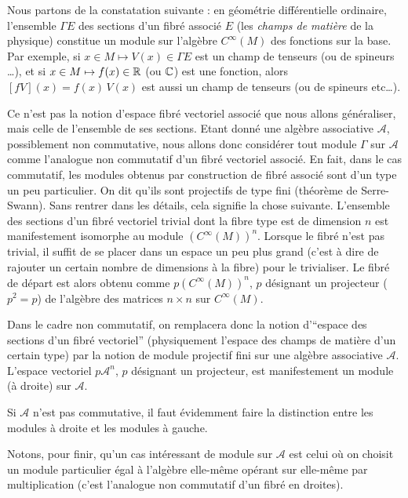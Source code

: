 Nous partons de la constatation suivante : en g\'eom\'etrie diff\'erentielle 
ordinaire, l'ensemble $\Gamma E$ des sections 
d'un fibr\'e associ\'e $E$ (les {\it champs de mati\`ere\/} de la 
physique) constitue un module sur l'alg\`ebre $C^\infty(M)$ des fonctions sur la base.
Par exemple, si $x \in M \mapsto V(x) \in \Gamma E$ est un champ de tenseurs (ou 
de spineurs \ldots), et si $x \in M \mapsto f(x) \in \mathbb{R} $ (ou $\mathbb{C}$) est 
une fonction, alors $ [fV](x) = f(x) \, V(x)$ est aussi un champ de 
tenseurs (ou de spineurs etc\ldots).

Ce n'est pas la notion d'espace fibr\'e vectoriel associ\'e que nous allons 
g\'en\'eraliser, mais celle de l'ensemble de ses sections.
Etant donn\'e une alg\`ebre associative ${\mathcal A}$, possiblement 
non commutative, nous allons donc consid\'erer tout module $\Gamma$ sur ${\mathcal 
A}$ comme l'analogue non commutatif d'un fibr\'e vectoriel associ\'e.
En fait, dans le cas commutatif, les modules obtenus par 
construction de fibr\'e associ\'e sont d'un type un peu particulier. On dit 
qu'ils sont projectifs de type fini (th\'eor\`eme de Serre-Swann). 
Sans rentrer dans les d\'etails, cela signifie la chose suivante.
L'ensemble des sections d'un fibr\'e vectoriel trivial dont la fibre 
type est de dimension $n$ est 
manifestement isomorphe au module ${(C^\infty(M))}^n$. Lorsque le fibr\'e 
n'est pas trivial, il suffit de se placer dans un espace un peu plus grand 
(c'est \`a dire de rajouter un certain nombre de dimensions \`a la fibre) pour le trivialiser.
Le fibr\'e de d\'epart est alors obtenu comme $p {(C^\infty(M))}^n$, 
$p$ d\'esignant un projecteur 
($p^{2}=p$) de l'alg\`ebre des matrices $n \times n$ sur $C^\infty(M)$.

Dans le cadre non commutatif, on remplacera donc la notion d'``espace 
des sections d'un fibr\'e vectoriel''  (physiquement l'espace des 
champs de mati\`ere d'un certain type) par la notion de module 
projectif fini sur une alg\`ebre associative ${\mathcal A}$. L'espace 
vectoriel $p {\mathcal A}^n$, $p$ d\'esignant un projecteur, est manifestement un module (\`a droite) sur ${\mathcal 
A}$.

 Si ${\mathcal A}$ n'est pas commutative, il faut \'evidemment faire la distinction 
entre les modules \`a droite et les modules \`a gauche.

Notons, pour finir, qu'un cas int\'eressant de module sur ${\mathcal A}$ 
est celui o\`u on choisit un module particulier \'egal \`a l'alg\`ebre 
elle-m\^eme op\'erant sur elle-m\^eme par multiplication (c'est l'analogue non commutatif d'un fibr\'e en droites). 

